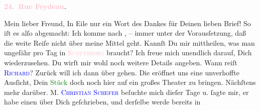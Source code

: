            \pstart
           \begin{otherlanguage}{french}\textcolor{gray}{\textbf{\textbf{\textcolor{pink}{24. Rue Feydeau}{}\ledrightnote{\textcolor{pink}{rue Feydeau}}.}}}\end{otherlanguage}\pend
           \pstart\center{}Mein lieber Freund,\pend\pstart
           In Eile nur ein Wort des Dankes für Deinen lieben Brief!\pend
           \pstart
           So iſt es alſo abgemacht: Ich komme nach \label{K_L02776-1v}\label{K_L02776-1h}, – immer unter  der Vorausſetzung, daß die weite Reiſe nicht über meine Mittel geht. Kannſt Du
               mir mittheilen, was man ungefähr pro Tag in \textsc{\textcolor{pink}{Scottsborg}{}} braucht? {\pb}Ich freue mich unendlich darauf,
               Dich wiederzusehen. Du wirſt mir wohl noch weitere Details angeben. Wann reiſt \textsc{\textcolor{blue}{Richard}{}\ledrightnote{\textcolor{blue}{Richard Beer-Hofmann}}}? Zurück will ich dann über \label{K_L02776-2v}\label{K_L02776-2h} gehen.\pend
           \pstart
           Die \label{K_L02776-4v}\label{K_L02776-4h} eröffnet uns eine
               unverhoffte Ausſicht, Dein \textcolor{green}{Stück}{} doch noch hier auf ein großes Theater zu bringen. Nächſtens mehr darüber.\pend
           \pstart
           {\pb}\textsc{M. \textcolor{blue}{Christian Schefer}{}\ledrightnote{\textcolor{blue}{Christian Schefer}}} beſuchte mich dieſer Tage u. ſagte mir, er habe einen \label{K_L02776-3v}\label{K_L02776-3h} über Dich geſchrieben, und derſelbe werde bereits in
